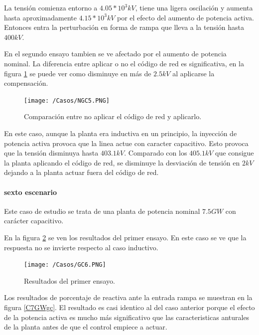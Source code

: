 \documentclass{book}
\begin{document}
La tensi\'on comienza entorno a $4.05 * 10^3 kV$, tiene una ligera oscilaci\'on y aumenta hasta aproximadamente $4.15* 10^3 kV$ por el efecto del aumento de potencia activa. Entonces entra la perturbaci\'on en forma de rampa que lleva a la tensi\'on hasta $400 kV$. 

En el segundo ensayo tambien se ve afectado por el aumento de potencia nominal. La diferencia entre aplicar o no el c\'odigo de red es significativa, en la figura \ref{NGC5} se puede ver como disminuye en m\'as de $2.5kV$ al aplicarse  la compensaci\'on. \par

\begin{figure}[h!]
\centering
\texttt{[image: /Casos/NGC5.PNG]}
\caption{Comparaci\'on entre no aplicar el c\'odigo de red y aplicarlo. }
\label{NGC5}
\end{figure} \par

En este caso, aunque la planta era inductiva en un principio, la inyecci\'on de potencia activa provoca que la linea actue con caracter capacitivo. Esto provoca que la tensi\'on disminuya hasta $403.1 kV$. Comparado con los $405.1 kV$ que consigue la planta aplicando el c\'odigo de red, se disminuye la desviaci\'on de tensi\'on en $2kV$ dejando a la planta actuar fuera del c\'odigo de red. 

	\paragraph{sexto escenario}

Este caso de estudio se trata de una planta de potencia nominal $7.5GW$ con car\'acter capacitivo. \par

En la figura \ref{GC6} se ven los resultados del primer ensayo. En este caso se ve que la respuesta no se invierte respecto al caso inductivo.   \par

\begin{figure}[h!]
\centering
\texttt{[image: /Casos/GC6.PNG]}
\caption{Resultados del primer ensayo. }
\label{GC6}
\end{figure} \par

Los resultados de porcentaje de reactiva ante la entrada rampa se muestran en la figura \ref{C7GWgc}. El resultado es casi identico al del caso anterior porque el efecto de la potencia activa es mucho m\'as significativo que las caracteristicas anturales de la planta antes de que el control empiece a actuar. \par
\end{document}
